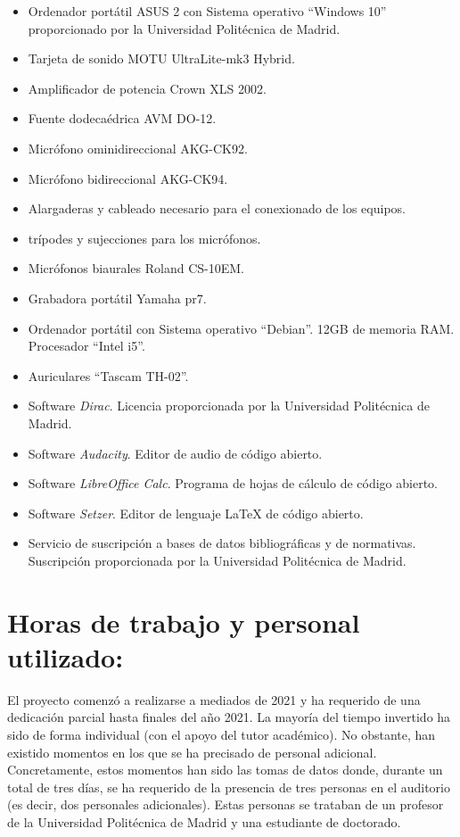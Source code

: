 \documentclass[11pt,a4paper]{book}
\begin{document}
    \begin{itemize}
        \item Ordenador portátil ASUS 2 con Sistema operativo ``Windows 10'' proporcionado por la Universidad Politécnica de Madrid.
	    \item Tarjeta de sonido MOTU UltraLite-mk3 Hybrid.
	    \item Amplificador de potencia Crown XLS 2002.
	    \item Fuente dodecaédrica AVM DO-12.
	    \item Micrófono ominidireccional AKG-CK92.
	    \item Micrófono bidireccional AKG-CK94.
	    \item Alargaderas y cableado necesario para el conexionado de los equipos.
	    \item trípodes y sujecciones para los micrófonos.
	    \item Micrófonos biaurales Roland CS-10EM.
	    \item Grabadora portátil Yamaha pr7.
        \item Ordenador portátil con Sistema operativo ``Debian''. 12GB de memoria RAM. Procesador ``Intel i5''.
	    \item Auriculares ``Tascam TH-02''. 
	    \item Software \textit{Dirac}. Licencia proporcionada por la Universidad Politécnica de Madrid.
	    \item Software \textit{Audacity}. Editor de audio de código abierto.
	    \item Software \textit{LibreOffice Calc}. Programa de hojas de cálculo de código abierto.
		\item Software \textit{Setzer}. Editor de lenguaje LaTeX de código abierto.
		\item Servicio de suscripción a bases de datos bibliográficas y de normativas. Suscripción proporcionada por la Universidad Politécnica de Madrid.
    \end{itemize}
    \section*{Horas de trabajo y personal utilizado:}
        El proyecto comenzó a realizarse a mediados de 2021 y ha requerido de una dedicación parcial hasta finales del año 2021. La mayoría del tiempo invertido ha sido de forma individual (con el apoyo del tutor académico). No obstante, han existido momentos en los que se ha precisado de personal adicional. Concretamente, estos momentos han sido las tomas de datos donde, durante un total de tres días, se ha requerido de la presencia de tres personas en el auditorio (es decir, dos personales adicionales). Estas personas se trataban de un profesor de la Universidad Politécnica de Madrid y una estudiante de doctorado.
        
\end{document}
